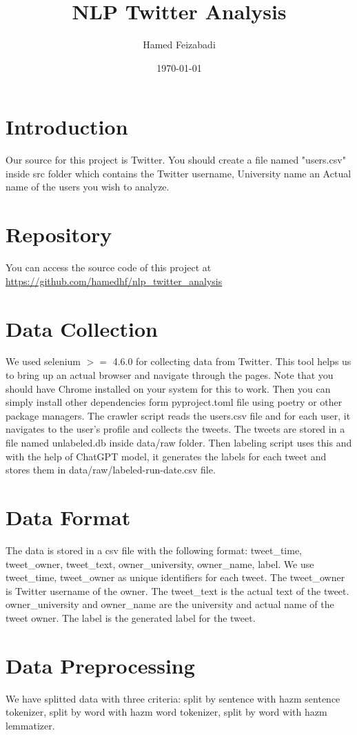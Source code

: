 \documentclass[12pt, letterpaper]{article}
\title{NLP Twitter Analysis}
\author{Hamed Feizabadi}
\date{\today}
\begin{document}
\maketitle

\section{Introduction}
Our source for this project is Twitter. You should create a file named "users.csv" inside src folder which contains the Twitter username, University name an Actual name of the users you wish to analyze.

\section{Repository}
You can access the source code of this project at \url{https://github.com/hamedhf/nlp_twitter_analysis}

\section{Data Collection}
We used selenium $>=$ 4.6.0 for collecting data from Twitter. This tool helps us to bring up an actual browser and navigate through the pages. Note that you should have Chrome installed on your system for this to work. Then you can simply install other dependencies form pyproject.toml file using poetry or other package managers.
The crawler script reads the users.csv file and for each user, it navigates to the user's profile and collects the tweets. The tweets are stored in a file named unlabeled.db inside data\slash raw folder. Then labeling script uses this and with the help of ChatGPT model, it generates the labels for each tweet and stores them in data\slash raw\slash labeled-run-date.csv file.

\section{Data Format}
The data is stored in a csv file with the following format: tweet\_time, tweet\_owner, tweet\_text, owner\_university, owner\_name, label.
We use tweet\_time, tweet\_owner as unique identifiers for each tweet. The tweet\_owner is Twitter username of the owner. The tweet\_text is the actual text of the tweet. owner\_university and owner\_name are the university and actual name of the tweet owner. The label is the generated label for the tweet.

\section{Data Preprocessing}
We have splitted data with three criteria: split by sentence with hazm sentence tokenizer, split by word with hazm word tokenizer, split by word with hazm lemmatizer.
\end{document}

